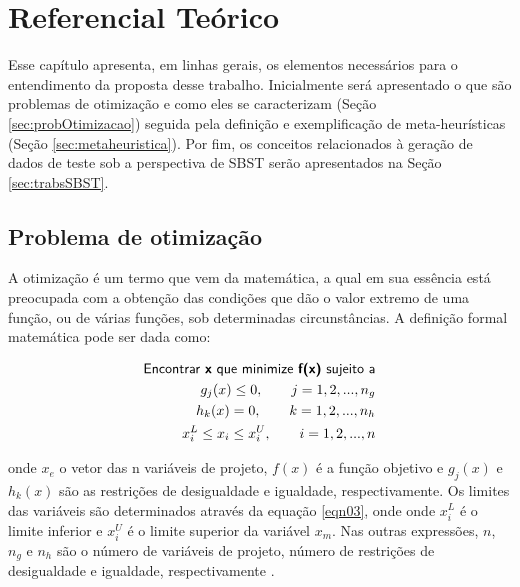 
\chapter[Referencial Teórico]{Referencial Teórico}
\label{referencialteorico}

Esse capítulo apresenta, em linhas gerais, os elementos necessários para o entendimento da proposta desse trabalho. Inicialmente será apresentado o que são problemas de otimização e como eles se caracterizam (Seção \ref{sec:probOtimizacao}) seguida pela definição e exemplificação de meta-heurísticas (Seção \ref{sec:metaheuristica}). Por fim, os conceitos relacionados à geração de dados de teste sob a perspectiva de SBST serão apresentados na Seção \ref{sec:trabsSBST}.

\section{Problema de otimização \label{sec:probOtimizacao}}

A otimização é um termo que vem da matemática, a qual em sua essência está preocupada com a obtenção das condições que dão o valor extremo de uma função, ou de várias funções, sob determinadas circunstâncias. A definição formal matemática pode ser dada como: 

\begin{eqnarray}
\label{eqn01}
	 \textsf{Encontrar \textbf{x} que minimize \textbf{f(x)} sujeito a} \nonumber \\
     g_j(x) \leq 0, \qquad j = 1, 2, ..., n_g \\
\label{eqn02}
      h_k(x) = 0, \qquad k = 1, 2, ..., n_h \\
\label{eqn03}
      x_{i}^{L} \leq x_i \leq x_{i}^{U}, \qquad i = 1, 2, ..., n 
\end{eqnarray}

onde $x_{e}$ o vetor das n variáveis de projeto, $f(x)$ é a função objetivo e $g_{j}(x)$ e $h_{k}(x)$ são as restrições de desigualdade e igualdade, respectivamente. Os limites das variáveis são determinados através da equação \ref{eqn03}, onde onde $x_{i}^{L}$ é o limite inferior e $x_{i}^{U}$ é o limite superior da variável $x_{m}$. Nas outras expressões, $n$, $n_{g}$ e $n_{h}$ são o número de variáveis de projeto, número de restrições de desigualdade e igualdade, respectivamente \cite{gandomi2013metaheuristic}.

